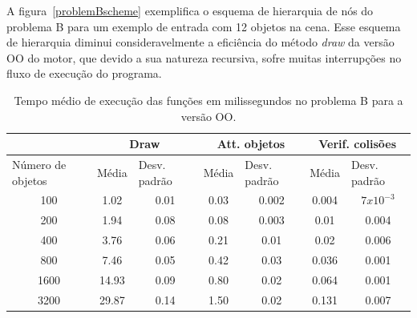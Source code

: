 A figura~\ref{problemBscheme} exemplifica o esquema de hierarquia 
de nós do problema B para um exemplo de entrada com 12 objetos na 
cena. Esse esquema de hierarquia diminui consideravelmente a 
eficiência do método \textit{draw} da versão OO do motor, que 
devido a sua natureza recursiva, sofre muitas interrupções no 
fluxo de execução do programa. 

\begin{table}[h!]
\centering
\caption{Tempo médio de execução das funções em milissegundos no problema B para a versão OO.}
\label{oodv2table}
\begin{tabular}{c|cc|cc|cc}
\cline{2-7}
                                       & \multicolumn{2}{c|}{Draw}                                     & \multicolumn{2}{c|}{Att. objetos}                              & \multicolumn{2}{c}{Verif. colisões}                \\ \hline
\multicolumn{1}{l|}{Número de objetos} & \multicolumn{1}{l}{Média} & \multicolumn{1}{l|}{Desv. padrão} & \multicolumn{1}{l}{Média} & \multicolumn{1}{l|}{Desv. padrão} & Média           & \multicolumn{1}{l}{Desv. padrão} \\ \hline
100                                     & 1.02                       & 0.01                             & 0.03                      & 0.002                               & 0.004           & $7 x 10^{-3}$                     \\ \hline
200                                     & 1.94                       & 0.08                             & 0.08                      & 0.003                               & 0.01            & 0.004                             \\ \hline
400                                     & 3.76                       & 0.06                             & 0.21                      & 0.01                                & 0.02            & 0.006                             \\ \hline
800                                     & 7.46                       & 0.05                             & 0.42                      & 0.03                                & 0.036           & 0.001                             \\ \hline
1600                                    & 14.93                      & 0.09                             & 0.80                      & 0.02                                & 0.064           & 0.001                             \\ \hline
3200                                    & 29.87                      & 0.14                             & 1.50                      & 0.02                                & 0.131           & 0.007                             \\ \hline
\end{tabular}
\end{table}

